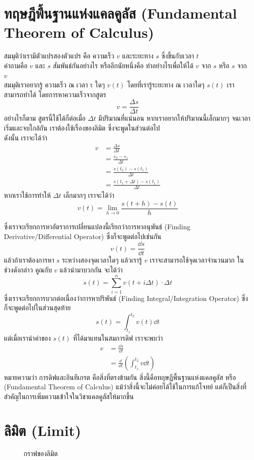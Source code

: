 \documentclass[12pt, a4paper, oneside]{article}
\begin{document}
\section{ทฤษฎีพื้นฐานแห่งแคลคูลัส (Fundamental Theorem of Calculus)}
สมมุติว่าเรามีตัวแปรสองตัวแปร คือ ความเร็ว $v$ และระยะทาง $s$ ซึ่งขึ้นกับเวลา $t$ \\
คำถามคือ $v$ และ $s$ สัมพันธ์กันอย่างไร หรืออีกนัยหนึ่งคือ ทำอย่างไรเพื่อให้ได้ $v$ จาก $s$ หรือ $s$ จาก $v$ \\
สมมุติเราอยากรู้ ความเร็ว ณ เวลา t ใดๆ $v(t)$ โดยที่เรารู้ระยะทาง ณ เวลาใดๆ $s(t)$ เราสามารถทำได้ โดยการหาความเร็วจากสูตร
\[v = \frac{\Delta s}{\Delta t}\]
อย่างไรก็ตาม สูตรนี้ใช้ได้ก็ต่อเมื่อ $\Delta t$ มีปริมาณที่แน่นอน หากเราอยากให้ปริมาณนี้เล็กมากๆ จนเวลาเริ่มและจบใกล้กัน เราต้องใช้เรื่องของลิมิต ซึ่งจะพูดในส่วนต่อไป \\
ดังนั้น เราจะได้ว่า
\begin{align}
    v &= \frac{\Delta s}{\Delta t} \\
      &= \frac{s_2-s_1}{\Delta t} \\
      &= \frac{s(t_2)-s(t_1)}{\Delta t} \\
      &= \frac{s(t_1+\Delta t)-s(t_1)}{\Delta t}
\end{align}
หากเราใช้การทำให้ $\Delta t$ เล็กมากๆ เราจะได้ว่า
\[v(t) = \lim_{h\to0}\frac{s(t+h)-s(t)}{h}\]

ซึ่งเราจะเรียกการหาอัตราการเปลี่ยนแปลงนี้เรียกว่าการหาอนุพันธ์ (Finding Derivative/Differential Operator) ซึ่งก็จะพูดต่อไปเช่นกัน
\[v(t) = \frac{\dd s}{\dd t}\]
แล้วถ้าเราต้องการหา $s$ ระหว่างสองจุดเวลาใดๆ แล้วเรารู้ $v$ เราจะสามารถใช้จุดเวลาจำนวนมาก ในช่วงดังกล่าว คูณกับ $v$ แล้วนำมาบวกกัน จะได้ว่า
\[s(t)=\sum_{i=1}^{n} v(t+i \Delta t)\cdot \Delta t\]
ซึ่งเราจะเรียกการบวกต่อเนื่องว่าการหาปริพันธ์ (Finding Integral/Integration Operator) ซึ่งก็จะพูดต่อไปในส่วนสุดท้าย
\[s(t)=\int_{t_1}^{t_2} v(t)\dd t\]
แต่เมื่อเรานำค่าของ $s(t)$ ที่ได้มาแทนในสมการดิฟ เราจะพบว่า 
\begin{align*}
    v &= \frac{\dd s}{\dd t}\\
      &= \frac{\dd}{\dd t}(\int_{t_1}^{t_2} v\dd t)
\end{align*}
หมายความว่า การดิฟและอินทีเกรต คือสิ่งที่ตรงข้ามกัน สิ่งนี้คือทฤษฎีพื้นฐานแห่งแคลคูลัส หรือ (Fundamental Theorem of Calculus) แม้ว่าสิ่งนี้จะไม่ค่อยได้ใช้ในการแก้โจทย์ แต่ก็เป็นสิ่งที่สำคัญในการเพิ่มความเข้าใจในวิชาแคลคูลัสให้มากขึ้น

\section{ลิมิต (Limit)}
\begin{figure}[!htb]
    \centering
    
    \caption{กราฟของลิมิต}
    \label{fig:tikz:epsilondelta}
\end{figure}
\end{document}

